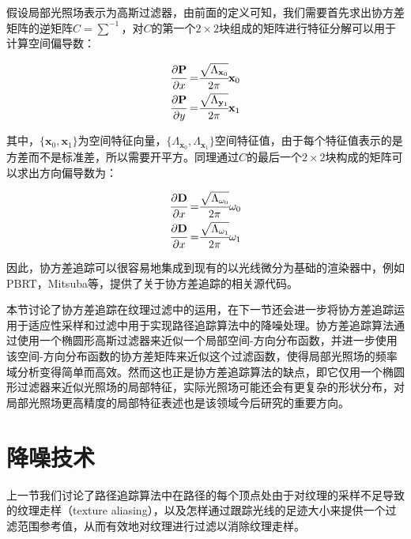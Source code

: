 假设局部光照场表示为高斯过滤器，由前面的定义可知，我们需要首先求出协方差矩阵的逆矩阵$C=\sum^{-1}$，对$C$的第一个$2\times 2$块组成的矩阵进行特征分解可以用于计算空间偏导数：

\begin{equation}
	\begin{aligned}
		 \cfrac{{\rm \partial}\mathbf{P}}{{\rm \partial} x}=& \cfrac{\sqrt{{\Lambda_{\mathbf{x}_0} }}}{2\pi}\mathbf{x}_0 \\
		 \cfrac{{\rm \partial}\mathbf{P}}{{\rm \partial} y}=& \cfrac{\sqrt{{\Lambda_{\mathbf{y}_1}}}}{2\pi}\mathbf{x}_1 \\
	\end{aligned}
\end{equation}

\noindent 其中，$\{\mathbf{x}_0,\mathbf{x}_1\}$为空间特征向量，$\{\Lambda_{\mathbf{x}_0},\Lambda_{\mathbf{x}_1}\}$空间特征值，由于每个特征值表示的是方差而不是标准差，所以需要开平方。同理通过$C$的最后一个$2\times 2$块构成的矩阵可以求出方向偏导数为：

\begin{equation}
	\begin{aligned}
		 \cfrac{{\rm \partial}\mathbf{D}}{{\rm \partial} x}=& \cfrac{\sqrt{{\Lambda_{\omega_0}}}}{2\pi}\omega_0 \\
		 \cfrac{{\rm \partial}\mathbf{D}}{{\rm \partial} x}=& \cfrac{\sqrt{{\Lambda_{\omega_1}}}}{2\pi}\omega_1 \\
	\end{aligned}
\end{equation}

\noindent 因此，协方差追踪可以很容易地集成到现有的以光线微分为基础的渲染器中，例如PBRT，Mitsuba等，\cite{a:Covariancetracingsourcecode}提供了关于协方差追踪的相关源代码。

本节讨论了协方差追踪在纹理过滤中的运用，在下一节还会进一步将协方差追踪运用于适应性采样和过滤中用于实现路径追踪算法中的降噪处理。协方差追踪算法通过使用一个椭圆形高斯过滤器来近似一个局部空间-方向分布函数，并进一步使用该空间-方向分布函数的协方差矩阵来近似这个过滤函数，使得局部光照场的频率域分析变得简单而高效。然而这也正是协方差追踪算法的缺点，即它仅用一个椭圆形过滤器来近似光照场的局部特征，实际光照场可能还会有更复杂的形状分布，对局部光照场更高精度的局部特征表述也是该领域今后研究的重要方向。







\section{降噪技术}\label{sec:pt-denoising}
上一节我们讨论了路径追踪算法中在路径的每个顶点处由于对纹理的采样不足导致的纹理走样（texture aliasing），以及怎样通过跟踪光线的足迹大小来提供一个过滤范围参考值，从而有效地对纹理进行过滤以消除纹理走样。

